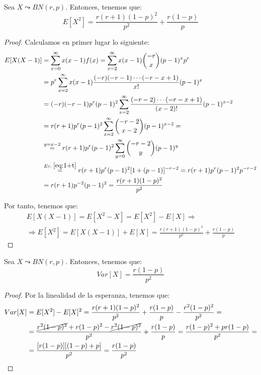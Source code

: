 \begin{lema}
    Sea $X\leadsto BN(r,p)$. Entonces, tenemos que:
    \begin{equation*}
        E[X^2]=\frac{r(r+1)(1-p)^2}{p^2} + \frac{r(1-p)}{p}
    \end{equation*}
\end{lema}
\begin{proof}
    Calculamos en primer lugar lo siguiente:
    \begin{equation*}\begin{split}
        E[X(X-1)]
        &= \sum_{x=0}^\infty x(x-1)f(x)
        = \sum_{x=2}^\infty x(x-1)\binom{-r}{x}(p-1)^xp^r \\
        &= p^r\sum_{x=2}^\infty x(x-1)\frac{(-r)(-r-1)\cdots (-r-x+1)}{x!}(p-1)^x \\
        &= (-r)(-r-1)p^r(p-1)^2\sum_{x=2}^\infty \frac{(-r-2)\cdots (-r-x+1)}{(x-2)!}(p-1)^{x-2} \\
        &= r(r+1)p^r(p-1)^2\sum_{x=2}^\infty \binom{-r-2}{x-2}(p-1)^{x-2} = \\
        &\stackrel{y=x-2}{=} r(r+1)p^r(p-1)^2\sum_{y=0}^\infty \binom{-r-2}{y}(p-1)^{y} \\
        &\stackrel{Ec.\;\ref{eq:1+t}}{=} r(r+1)p^r(p-1)^2[1+(p-1)]^{-r-2}
        = r(r+1)p^r(p-1)^2p^{-r-2} \\
        &= r(r+1)p^{-2}(p-1)^2
        = \frac{r(r+1)(1-p)^2}{p^2}
    \end{split}\end{equation*}

    Por tanto, tenemos que:
    \begin{multline*}
        E[X(X-1)] = E[X^2-X] = E[X^2] - E[X]
        \Longrightarrow \\ \Longrightarrow
        E[X^2] = E[X(X-1)] + E[X] = \frac{r(r+1)(1-p)^2}{p^2} + \frac{r(1-p)}{p}
    \end{multline*}
\end{proof}


\begin{coro}
    Sea $X\leadsto BN(r,p)$. Entonces, tenemos que:
    \begin{equation*}
        Var[X]=\frac{r(1-p)}{p^2}
    \end{equation*}
\end{coro}
\begin{proof}
    Por la linealidad de la esperanza, tenemos que:
    \begin{equation*}\begin{split}
        Var[X] &= E[X^2] - E[X]^2 = \frac{r(r+1)(1-p)^2}{p^2} + \frac{r(1-p)}{p} - \frac{r^2(1-p)^2}{p^2} =\\
        &=  \frac{\cancel{r^2(1-p)^2} +r(1-p)^2 - \cancel{r^2(1-p)^2}}{p^2} + \frac{r(1-p)}{p}
        = \frac{r(1-p)^2 + pr(1-p)}{p^2} =\\
        &= \frac{[r(1-p)][(1-p)+p]}{p^2}
        = \frac{r(1-p)}{p^2}
    \end{split}\end{equation*}
\end{proof}


